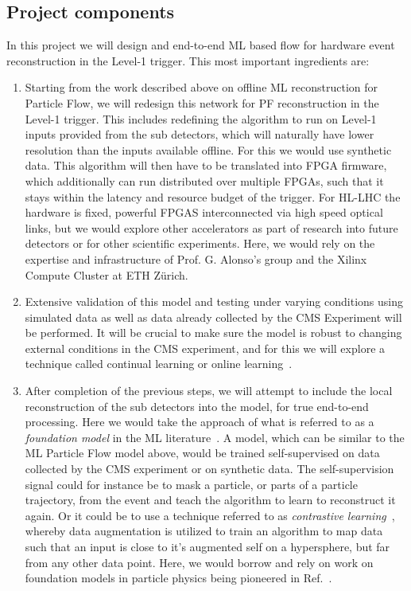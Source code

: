 \documentclass[12pt]{iopart}
\begin{document}
\subsection{Project components}
In this project we will design and end-to-end ML based flow for hardware event reconstruction in the Level-1 trigger. This most important ingredients are:
\begin{enumerate}
    \item Starting from the work described above on offline ML reconstruction for Particle Flow, we will redesign this network for PF reconstruction in the Level-1 trigger. This includes redefining the algorithm to run on Level-1 inputs provided from the sub detectors, which will naturally have lower resolution than the inputs available offline. For this we would use synthetic data. This algorithm will then have to be translated into FPGA firmware, which additionally can run distributed over multiple FPGAs, such that it stays within the latency and resource budget of the trigger. For HL-LHC the hardware is fixed, powerful FPGAS interconnected via high speed optical links, but we would explore other accelerators as part of research into future detectors or for other scientific experiments. Here, we would rely on the expertise and infrastructure of Prof. G. Alonso's group and the Xilinx Compute Cluster at ETH Zürich.
    \item Extensive validation of this model and testing under varying conditions using simulated data as well as data already collected by the CMS Experiment will be performed. It will be crucial to make sure the model is robust to changing external conditions in the CMS experiment, and for this we will explore a technique called continual learning or online learning~\cite{soutifcormerais2023comprehensive}. 
    \item After completion of the previous steps, we will attempt to include the local reconstruction of the sub detectors into the model, for true end-to-end processing. Here we would take the approach of what is referred to as a \textit{foundation model} in the ML literature~\cite{Bommasani2021FoundationModels}. A model, which can be similar to the ML Particle Flow model above, would be trained self-supervised on data collected by the CMS experiment or on synthetic data. The self-supervision signal could for instance be to mask a particle, or parts of a particle trajectory, from the event and teach the algorithm to learn to reconstruct it again. Or it could be to use a technique referred to as \textit{contrastive learning}~\cite{chen2020simple}, whereby data augmentation is utilized to train an algorithm to map data such that an input is close to it's augmented self on a hypersphere, but far from any other data point. Here, we would borrow and rely on work on foundation models in particle physics being pioneered in Ref.~\cite{foundation}.
\end{enumerate}
\end{document}
